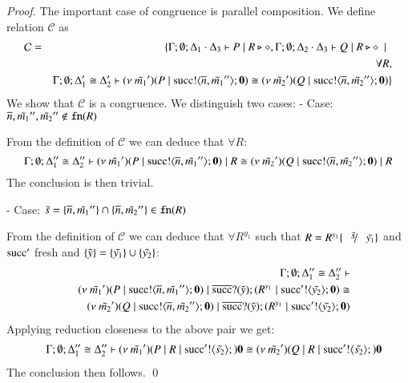 \begin{proof}
	The important case of congruence is parallel composition.
	We define relation $\mathcal{C}$ as
%
	\begin{eqnarray*}
		\mathcal{C} &=&	\{ \Gamma; \emptyset; \Delta_1 \cdot \Delta_3 \vdash P \;|\; R \triangleright \diamond,  \Gamma; \emptyset; \Delta_2 \cdot \Delta_3 \vdash Q \;|\; R \triangleright \diamond \ \ |\ \  \\
		& &	\forall R,\\
		& &	\Gamma; \emptyset; \Delta_1' \cong \Delta_2' \vdash (\nu\ \tilde{m_1}')(P \;|\; \textrm{succ} ! \langle \overline{n}, \tilde{m_1}'' \rangle ; \mathbf{0}) \cong (\nu\ \tilde{m_2}')(Q \;|\; \textrm{succ} ! \langle \overline{n}, \tilde{m_2}'' \rangle ; \mathbf{0})\}
	\end{eqnarray*}
%
	We show that $\mathcal{C}$ is a congruence.
	We distinguish two cases:
	- Case: $\overline{n}, \tilde{m_1}'', \tilde{m_2}'' \notin \mathtt{fn}(R)$	

	\noi From the definition of $\mathcal{C}$ we can deduce that $\forall R$:
\[
	\Gamma; \emptyset; \Delta_1'' \cong \Delta_2'' \vdash (\nu\ \tilde{m_1}')(P \;|\; \textrm{succ} ! \langle \overline{n}, \tilde{m_1}'' \rangle ; \mathbf{0}) \;|\; R \cong (\nu\ \tilde{m_2}')(Q \;|\; \textrm{succ} ! \langle \overline{n}, \tilde{m_2}'' \rangle ; \mathbf{0}) \;|\; R
\]
	\noi The conclusion is then trivial.

	- Case: $\tilde{s} = \{\overline{n}, \tilde{m_1}''\} \cap \{\overline{n}, \tilde{m_2}''\} \in \mathtt{fn}(R)$

	\noi From the definition of $\mathcal{C}$ we can deduce that $\forall R^{y_1}$ such that $R = R^{y_1}\subst{\tilde{s}}{\tilde{y_1}}$
	and $\textrm{succ}'$ fresh and $\{\tilde{y}\} = \{\tilde{y_1}\} \cup \{\tilde{y_2}\}$:
	\begin{eqnarray*}
		&& \Gamma; \emptyset; \Delta_1'' \cong \Delta_2'' \vdash\\
		&& (\nu\ \tilde{m_1}')(P \;|\; \textrm{succ} ! \langle \overline{n}, \tilde{m_1}'' \rangle ; \mathbf{0}) \;|\; \overline{\textrm{succ}} ? (\tilde{y}) ; (R^{y_1} \;|\; \textrm{succ}' ! \langle \tilde{y_2} \rangle ; \mathbf{0}) \cong\\
		&& (\nu\ \tilde{m_2}')(Q \;|\; \textrm{succ} ! \langle \overline{n}, \tilde{m_2}'' \rangle ; \mathbf{0}) \;|\; \overline{\textrm{succ}} ? (\tilde{y}) ; (R^{y_1} \;|\; \textrm{succ}' ! \langle \tilde{y_2} \rangle ; \mathbf{0})
	\end{eqnarray*}
	Applying reduction closeness to the above pair we get:
	\begin{eqnarray*}
		&& \Gamma; \emptyset; \Delta_1'' \cong \Delta_2'' \vdash
		(\nu\ \tilde{m_1}')(P \;|\; R \;|\; \textrm{succ}' ! \langle \tilde{s_2} \rangle ;) \mathbf{0} \cong
		(\nu\ \tilde{m_2}')(Q \;|\; R \;|\; \textrm{succ}' ! \langle \tilde{s_2} \rangle ;) \mathbf{0}
	\end{eqnarray*}
	\noi The conclusion then follows.
	\qed
\end{proof}



